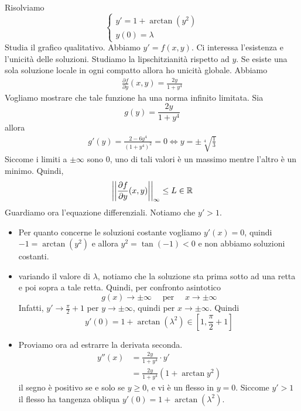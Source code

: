 \documentclass[a4paper]{article}
\begin{document}
\begin{snippetexercise}{}
    Risolviamo
    \[
        \begin{cases}
            y' = 1 + \arctan(y^2) \\
            y(0) = \lambda
        \end{cases}
    \]
    Studia il grafico qualitativo.
    Abbiamo \(y' = f(x,y)\). Ci interessa l'esistenza e l'unicità delle soluzioni.
    Studiamo la lipschitzianità rispetto ad \(y\).
    Se esiste una sola soluzione locale in ogni compatto allora ho unicità globale.
    Abbiamo
    \begin{align*}
        \frac{\partial f}{\partial y}(x,y) = \frac{2y}{1 + y^4}
    \end{align*}
    Vogliamo mostrare che tale funzione ha una norma infinito limitata.
    Sia
    \[
        g(y) = \frac{2y}{1 + y^4}
    \]
    allora
    \begin{align*}
        g'(y) = \frac{2 - 6y^4}{{(1 + y^4)}^2} = 0
        \iff y = \pm \sqrt[4]{\frac{1}{3}}
    \end{align*}
    Siccome i limiti a \(\pm\infty\) sono \(0\), uno di tali valori
    è un massimo mentre l'altro è un minimo.
    Quindi,
    \[
        \left|\left|
            \frac{\partial f}{\partial y}(x,y)
        \right|\right|_\infty \leq L \in \mathbb{R}
    \]
    Guardiamo ora l'equazione differenziali.
    Notiamo che \(y' > 1\).
    \begin{itemize}
        \item Per quanto concerne le soluzioni costante vogliamo
        \(y'(x) = 0\), quindi \(-1 = \arctan(y^2)\)
        e allora \(y^2 = \tan(-1) < 0\) e non abbiamo soluzioni costanti.
        \item variando il valore di \(\lambda\), notiamo che
        la soluzione sta prima sotto ad una retta e poi sopra a tale retta. Quindi, per confronto asintotico
        \[
            g(x) \to \pm\infty \quad \text{ per } \quad
            x\to\pm\infty
        \]
        Infatti, \(y' \to \frac{\pi}{2} + 1\) per \(y\to \pm\infty\),
        quindi per \(x\to\pm\infty\).
        Quindi \[y'(0) = 1 + \arctan(\lambda^2) \in \left[1, \frac{\pi}{2} + 1\right]\]
        \item Proviamo ora ad estrarre la derivata seconda.
        \begin{align*}
            y''(x) &= \frac{2y}{1 + y^4} \cdot y' \\
            &= \frac{2y}{1 + y^4}\left(1 + \arctan y^2\right)
        \end{align*}
        il segno è positivo se e solo se \(y \geq 0\),
        e vi è un flesso in \(y=0\). Siccome \(y'>1\) il flesso
        ha tangenza obliqua \(y'(0) = 1 + \arctan(\lambda^2)\).
    \end{itemize}
\end{snippetexercise}
\end{document}

